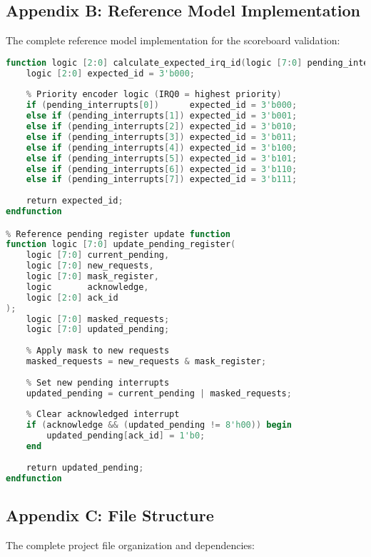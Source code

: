 \documentclass[12pt,a4paper]{article}
\begin{document}
\subsection{Appendix B: Reference Model Implementation}
The complete reference model implementation for the scoreboard validation:

\begin{lstlisting}[caption=Complete Reference Model Code, language=Verilog]
% Reference model function for expected behavior calculation
function logic [2:0] calculate_expected_irq_id(logic [7:0] pending_interrupts);
    logic [2:0] expected_id = 3'b000;
    
    % Priority encoder logic (IRQ0 = highest priority)
    if (pending_interrupts[0])      expected_id = 3'b000;
    else if (pending_interrupts[1]) expected_id = 3'b001;
    else if (pending_interrupts[2]) expected_id = 3'b010;
    else if (pending_interrupts[3]) expected_id = 3'b011;
    else if (pending_interrupts[4]) expected_id = 3'b100;
    else if (pending_interrupts[5]) expected_id = 3'b101;
    else if (pending_interrupts[6]) expected_id = 3'b110;
    else if (pending_interrupts[7]) expected_id = 3'b111;
    
    return expected_id;
endfunction

% Reference pending register update function
function logic [7:0] update_pending_register(
    logic [7:0] current_pending,
    logic [7:0] new_requests,
    logic [7:0] mask_register,
    logic       acknowledge,
    logic [2:0] ack_id
);
    logic [7:0] masked_requests;
    logic [7:0] updated_pending;
    
    % Apply mask to new requests
    masked_requests = new_requests & mask_register;
    
    % Set new pending interrupts
    updated_pending = current_pending | masked_requests;
    
    % Clear acknowledged interrupt
    if (acknowledge && (updated_pending != 8'h00)) begin
        updated_pending[ack_id] = 1'b0;
    end
    
    return updated_pending;
endfunction
\end{lstlisting}

\subsection{Appendix C: File Structure}
The complete project file organization and dependencies:
\end{document}
